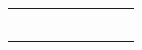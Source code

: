 \begin{table}[ht]
\begin{tabular}{rrrrrrrrr}
\textbf{}                                                                                                       &                                                 &                                                 &                                                            &                                                           &                      &                      &                      &                      \\
\textbf{}                                                                                                       & \textbf{}                                       & \textbf{}                                       & \textbf{}                                                  & \textbf{}                                                 & \textbf{}            & \textbf{}            & \textbf{}            & \textbf{}            \\
\textbf{}                                                                                                       &                                                 &                                                 &                                                            &                                                           &                      &                      &                      &                      \\
\textbf{}                                                                                                       &                                                 &                                                 &                                                            &                                                           &                      &                      &                      &                      \\
                                                                                                                &                                                 &                                                 &                                                            &                                                           &                      &                      &                      &                      \\
                                                                                                                &                                                 &                                                 &                                                            &                                                           &                      &                      &                      &                     
\end{tabular}
\end{table}


